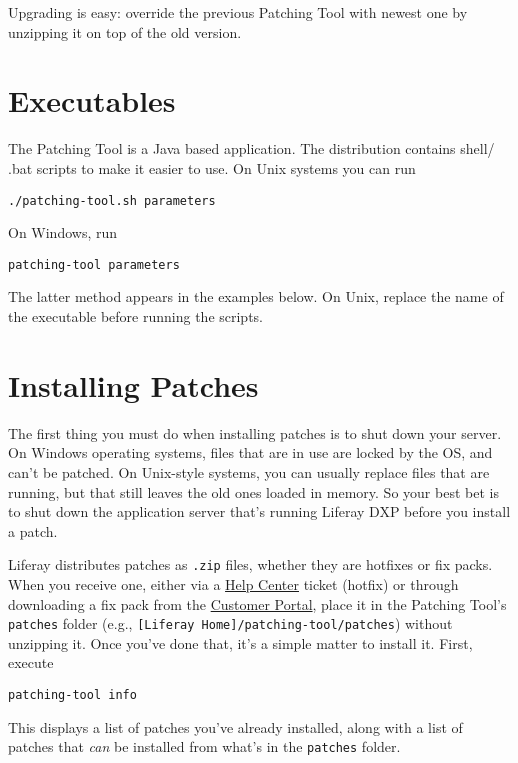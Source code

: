 Upgrading is easy: override the previous Patching Tool with newest one
by unzipping it on top of the old version.

\section{Executables}\label{executables}

The Patching Tool is a Java based application. The distribution contains
shell/ .bat scripts to make it easier to use. On Unix systems you can
run

\begin{verbatim}
./patching-tool.sh parameters
\end{verbatim}

On Windows, run

\begin{verbatim}
patching-tool parameters
\end{verbatim}

The latter method appears in the examples below. On Unix, replace the
name of the executable before running the scripts.

\section{Installing Patches}\label{installing-patches}

The first thing you must do when installing patches is to shut down your
server. On Windows operating systems, files that are in use are locked
by the OS, and can't be patched. On Unix-style systems, you can usually
replace files that are running, but that still leaves the old ones
loaded in memory. So your best bet is to shut down the application
server that's running Liferay DXP before you install a patch.

Liferay distributes patches as \texttt{.zip} files, whether they are
hotfixes or fix packs. When you receive one, either via a
\href{https://help.liferay.com/hc}{Help Center} ticket (hotfix) or
through downloading a fix pack from the
\href{https://web.liferay.com/group/customer}{Customer Portal}, place it
in the Patching Tool's \texttt{patches} folder (e.g.,
\texttt{{[}Liferay\ Home{]}/patching-tool/patches}) without unzipping
it. Once you've done that, it's a simple matter to install it. First,
execute

\begin{verbatim}
patching-tool info
\end{verbatim}

This displays a list of patches you've already installed, along with a
list of patches that \emph{can} be installed from what's in the
\texttt{patches} folder.

